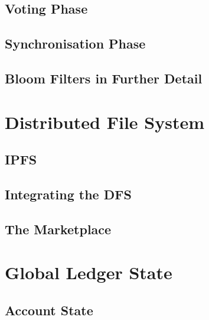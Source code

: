 \documentclass{article}
\begin{document}



\subsection{Voting Phase}



\subsection{Synchronisation Phase}



\subsection{Bloom Filters in Further Detail}




\newpage
\section{Distributed File System}



\subsection{IPFS}



\subsection{Integrating the DFS}



\subsection{The Marketplace}


\newpage
\section{Global Ledger State}


\subsection{Account State}

\end{document}
